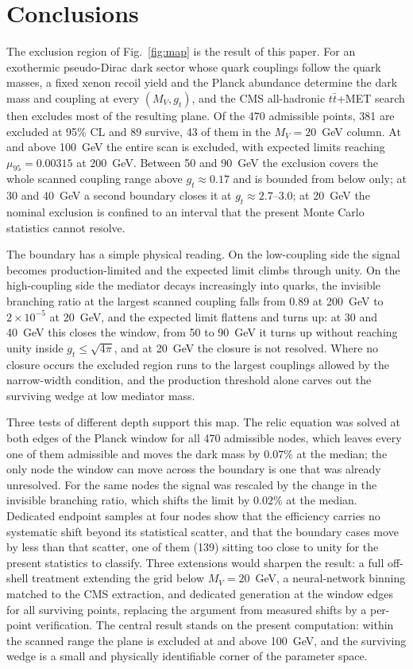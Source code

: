 \section{Conclusions}\label{sec:concl}

The exclusion region of Fig.~\ref{fig:map} is the result of this paper. For an exothermic pseudo-Dirac dark sector whose quark couplings follow the quark masses, a fixed xenon recoil yield and the Planck abundance determine the dark mass and coupling at every $(M_V,g_t)$, and the CMS all-hadronic $t\bar t$+MET search then excludes most of the resulting plane. Of the 470 admissible points, 381 are excluded at 95\% CL and 89 survive, 43 of them in the $M_V=20$~GeV column. At and above 100~GeV the entire scan is excluded, with expected limits reaching $\mu_{95}=0.00315$ at 200~GeV. Between 50 and 90~GeV the exclusion covers the whole scanned coupling range above $g_t\approx0.17$ and is bounded from below only; at 30 and 40~GeV a second boundary closes it at $g_t\approx2.7$--$3.0$; at 20~GeV the nominal exclusion is confined to an interval that the present Monte Carlo statistics cannot resolve.

The boundary has a simple physical reading. On the low-coupling side the signal becomes production-limited and the expected limit climbs through unity. On the high-coupling side the mediator decays increasingly into quarks, the invisible branching ratio at the largest scanned coupling falls from $0.89$ at 200~GeV to $2\times10^{-5}$ at 20~GeV, and the expected limit flattens and turns up: at 30 and 40~GeV this closes the window, from 50 to 90~GeV it turns up without reaching unity inside $g_t\le\sqrt{4\pi}$, and at 20~GeV the closure is not resolved. Where no closure occurs the excluded region runs to the largest couplings allowed by the narrow-width condition, and the production threshold alone carves out the surviving wedge at low mediator mass.

Three tests of different depth support this map. The relic equation was solved at both edges of the Planck window for all 470 admissible nodes, which leaves every one of them admissible and moves the dark mass by $0.07\%$ at the median; the only node the window can move across the boundary is one that was already unresolved. For the same nodes the signal was rescaled by the change in the invisible branching ratio, which shifts the limit by $0.02\%$ at the median. Dedicated endpoint samples at four nodes show that the efficiency carries no systematic shift beyond its statistical scatter, and that the boundary cases move by less than that scatter, one of them (139) sitting too close to unity for the present statistics to classify. Three extensions would sharpen the result: a full off-shell treatment extending the grid below $M_V=20$~GeV, a neural-network binning matched to the CMS extraction, and dedicated generation at the window edges for all surviving points, replacing the argument from measured shifts by a per-point verification. The central result stands on the present computation: within the scanned range the plane is excluded at and above 100~GeV, and the surviving wedge is a small and physically identifiable corner of the parameter space.
